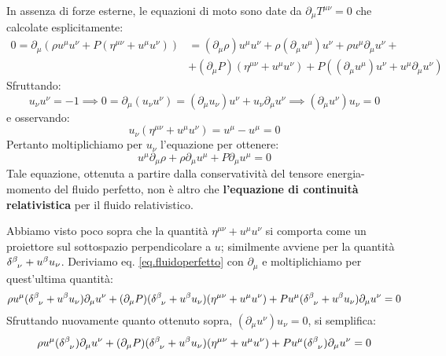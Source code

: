 In assenza di forze esterne, le equazioni di moto sono date da $\partial_\mu T^{\mu\nu}=0$ che calcolate esplicitamente:
\begin{align*}
    0 = \partial_\mu( \rho u^\mu u^\nu + P(\eta^{\mu\nu} + u^\mu u^\nu) ) &= (\partial_\mu \rho)u^\mu u^\nu + \rho( \partial_\mu u^\mu) u^\nu + \rho u^\mu \partial_\mu u^\nu + \\ &+ (\partial_\mu P)(\eta^{\mu\nu} + u^\mu u^\nu ) +P( (\partial_\mu u^\mu) u^\nu + u^\mu \partial_\mu u^\nu )
\end{align*}
Sfruttando:
\begin{equation*}
    u_\nu u^\nu = -1 \implies 0 = \partial_\mu(u_\nu u^\nu) = (\partial_\mu u_\nu)u^\nu + u_\nu \partial_\mu u^\nu \implies (\partial_\mu u^\nu) u_\nu = 0
\end{equation*}
e osservando:
\begin{equation*}
    u_\nu( \eta^{\mu\nu} + u^\mu u^\nu) = u^\mu - u^\mu = 0
\end{equation*}
Pertanto moltiplichiamo per $u_\nu$ l'equazione per ottenere:
\begin{equation}
    u^\mu \partial_\mu \rho + \rho \partial_\mu u^\mu + P\partial_\mu u^\mu = 0
    \label{eq.continuitàrelativistica}
\end{equation}
Tale equazione, ottenuta a partire dalla conservatività del tensore energia-momento del fluido perfetto, non è altro che \textbf{l'equazione di continuità relativistica} per il fluido relativistico.

Abbiamo visto poco sopra che la quantità $\eta^{\mu\nu} + u^\mu u^\nu$ si comporta come un proiettore sul sottospazio perpendicolare a $u$; similmente avviene per la quantità $\tensor{\delta}{^\beta_\nu} + u^\beta u_\nu$. Deriviamo eq. \ref{eq.fluidoperfetto} con $\partial_\mu$ e moltiplichiamo per quest'ultima quantità:
\begin{equation*}
    \rho u^\mu (\tensor{\delta}{^\beta_\nu} + u^\beta u_\nu) \partial_\mu u^\nu +(\partial_\mu P)(\tensor{\delta}{^\beta_\nu} + u^\beta u_\nu)(\eta^{\mu\nu} + u^\mu u^\nu) + P u^\mu (\tensor{\delta}{^\beta_\nu} + u^\beta u_\nu) \partial_\mu u^\nu = 0
\end{equation*}
Sfruttando nuovamente quanto ottenuto sopra, $(\partial_\mu u^\nu) u_\nu = 0$, si semplifica:
\begin{equation*}
    \rho u^\mu (\tensor{\delta}{^\beta_\nu}) \partial_\mu u^\nu +(\partial_\mu P)(\tensor{\delta}{^\beta_\nu} + u^\beta u_\nu)(\eta^{\mu\nu} + u^\mu u^\nu) + P u^\mu (\tensor{\delta}{^\beta_\nu}) \partial_\mu u^\nu = 0
\end{equation*}

